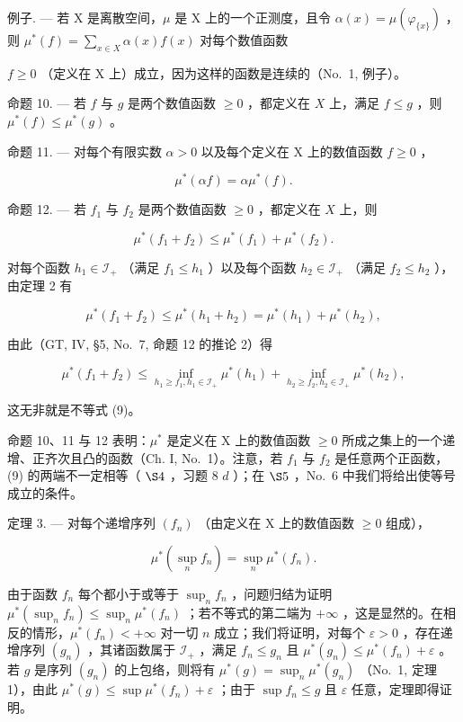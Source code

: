 例子. --- 若 X 是离散空间，\(\mu\) 是 X 上的一个正测度，且令 \(\alpha(x) = \mu(\varphi_{\{x\}})\) ，则 \(\mu^{*}(f) = \sum_{x \in X} \alpha(x)f(x)\) 对每个数值函数

\(f \geqslant 0\) （定义在 X 上）成立，因为这样的函数是连续的（No.~1, 例子）。

命题 10. --- 若 \(f\) 与 \(g\) 是两个数值函数 \(\geqslant 0\) ，都定义在 \(X\) 上，满足 \(f \leqslant g\) ，则 \(\mu^{*}(f) \leqslant \mu^{*}(g)\) 。

命题 11. --- 对每个有限实数 \(\alpha > 0\) 以及每个定义在 X 上的数值函数 \(f \geqslant 0\) ，

\[
\mu^ {*} (\alpha f) = \alpha \mu^ {*} (f).\tag{8}
\]

命题 12. --- 若 \(f_1\) 与 \(f_2\) 是两个数值函数 \(\geqslant 0\) ，都定义在 \(X\) 上，则

\[
\mu^ {*} (f _ {1} + f _ {2}) \leqslant \mu^ {*} (f _ {1}) + \mu^ {*} (f _ {2}).\tag{9}
\]

对每个函数 \(h_1 \in \mathcal{I}_+\) （满足 \(f_1 \leqslant h_1\) ）以及每个函数 \(h_2 \in \mathcal{I}_+\) （满足 \(f_2 \leqslant h_2\) ），由定理 2 有

\[
\mu^ {*} (f _ {1} + f _ {2}) \leqslant \mu^ {*} (h _ {1} + h _ {2}) = \mu^ {*} (h _ {1}) + \mu^ {*} (h _ {2}),
\]

由此（GT, IV, §5, No.~7, 命题 12 的推论 2）得

\[
\mu^ {*} (f _ {1} + f _ {2}) \leqslant \inf _ {h _ {1} \geqslant f _ {1}, h _ {1} \in \mathcal {I} _ {+}} \mu^ {*} (h _ {1}) + \inf _ {h _ {2} \geqslant f _ {2}, h _ {2} \in \mathcal {I} _ {+}} \mu^ {*} (h _ {2}),
\]

这无非就是不等式 (9)。

命题 10、11 与 12 表明：\(\mu^{*}\) 是定义在 X 上的数值函数 \(\geqslant 0\) 所成之集上的一个递增、正齐次且凸的函数（Ch. I, No.~1）。注意，若 \(f_{1}\) 与 \(f_{2}\) 是任意两个正函数，(9) 的两端不一定相等（ \(\S 4\) ，习题 8 \(d\) ）；在 \(\S 5\) ，No.~6 中我们将给出使等号成立的条件。

定理 3. --- 对每个递增序列 \((f_{n})\) （由定义在 X 上的数值函数 \(\geqslant 0\) 组成），

\[
\mu^ {*} \left(\sup _ {n} f _ {n}\right) = \sup _ {n} \mu^ {*} (f _ {n}).\tag{10}
\]

由于函数 \(f_n\) 每个都小于或等于 \(\sup_{n} f_n\) ，问题归结为证明 \(\mu^*(\sup_{n} f_n) \leqslant \sup_{n} \mu^*(f_n)\) ；若不等式的第二端为 \(+\infty\) ，这是显然的。在相反的情形，\(\mu^*(f_n) < +\infty\) 对一切 \(n\) 成立；我们将证明，对每个 \(\varepsilon > 0\) ，存在递增序列 \((g_n)\) ，其诸函数属于 \(\mathcal{I}_+\) ，满足 \(f_n \leqslant g_n\) 且 \(\mu^*(g_n) \leqslant \mu^*(f_n) + \varepsilon\) 。若 \(g\) 是序列 \((g_n)\) 的上包络，则将有 \(\mu^*(g) = \sup_n \mu^*(g_n)\) （No.~1, 定理 1），由此 \(\mu^*(g) \leqslant \sup \mu^*(f_n) + \varepsilon\) ；由于 \(\sup f_n \leqslant g\) 且 \(\varepsilon\) 任意，定理即得证明。

